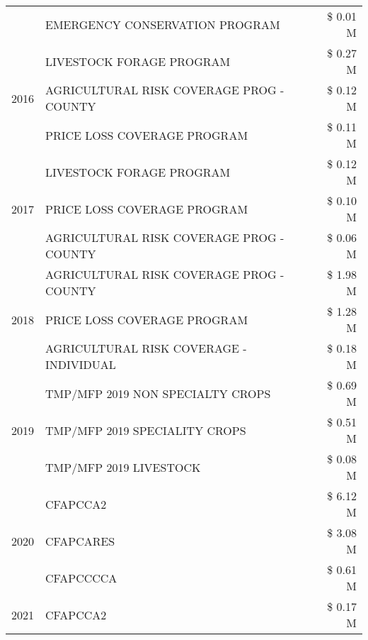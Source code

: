 \begin{tabular}{llr}
 & EMERGENCY CONSERVATION PROGRAM & \$ 0.01 M \\
\cline{1-3}
\multirow[t]{3}{*}{2016} & LIVESTOCK FORAGE PROGRAM                      & \$ 0.27 M \\
 & AGRICULTURAL RISK COVERAGE PROG - COUNTY      & \$ 0.12 M \\
 & PRICE LOSS COVERAGE PROGRAM                   & \$ 0.11 M \\
\cline{1-3}
\multirow[t]{3}{*}{2017} & LIVESTOCK FORAGE PROGRAM & \$ 0.12 M \\
 & PRICE LOSS COVERAGE PROGRAM & \$ 0.10 M \\
 & AGRICULTURAL RISK COVERAGE PROG - COUNTY & \$ 0.06 M \\
\cline{1-3}
\multirow[t]{3}{*}{2018} & AGRICULTURAL RISK COVERAGE PROG - COUNTY & \$ 1.98 M \\
 & PRICE LOSS COVERAGE PROGRAM & \$ 1.28 M \\
 & AGRICULTURAL RISK COVERAGE - INDIVIDUAL & \$ 0.18 M \\
\cline{1-3}
\multirow[t]{3}{*}{2019} & TMP/MFP 2019 NON SPECIALTY CROPS & \$ 0.69 M \\
 & TMP/MFP 2019 SPECIALITY CROPS & \$ 0.51 M \\
 & TMP/MFP 2019 LIVESTOCK & \$ 0.08 M \\
\cline{1-3}
\multirow[t]{3}{*}{2020} & CFAPCCA2 & \$ 6.12 M \\
 & CFAPCARES & \$ 3.08 M \\
 & CFAPCCCCA & \$ 0.61 M \\
\cline{1-3}
2021 & CFAPCCA2 & \$ 0.17 M \\
\cline{1-3}
\bottomrule
\end{tabular}
